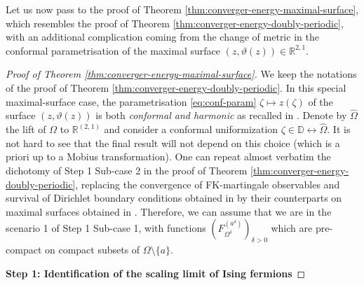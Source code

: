 \documentclass[reqno]{amsart}
\numberwithin{equation}{section}
\theoremstyle{definition}
\theoremstyle{remark}
\begin{document}
Let us now pass to the proof of Theorem \ref{thm:converger-energy-maximal-surface}, which resembles the proof of Theorem \ref{thm:converger-energy-doubly-periodic}, with an additional complication coming from the change of metric in the conformal parametrisation of the maximal surface $(z,\vartheta(z))\in \mathbb{R}^{2,1} $.
\begin{proof}[Proof of Theorem \ref{thm:converger-energy-maximal-surface}] We keep the notations of the proof of Theorem \ref{thm:converger-energy-doubly-periodic}.
In this special maximal-surface case, the parametrisation \eqref{eq:conf-param} $\zeta \mapsto z(\zeta)$ of the surface $(z, \vartheta(z))$ is both \emph{conformal and harmonic} as recalled in \cite[Section 2.5]{CLR2}. Denote by $\widehat{\Omega}$ the lift of  $\Omega$ to $\mathbb{R}^{(2,1)}$ and consider a conformal uniformization $\zeta \in \mathbb{D} \leftrightarrow  \widehat{\Omega}$. It is not hard to see that the final result will not depend on this choice (which is a priori up to a Mobius transformation). One can repeat almost verbatim the dichotomy of Step 1 Sub-case 2 in the proof of Theorem \ref{thm:converger-energy-doubly-periodic}, replacing the convergence of FK-martingale observables and survival of Dirichlet boundary conditions obtained in \cite{Che20} by their counterparts on maximal surfaces obtained in \cite{Par25}. Therefore, we can assume that we are in the scenario 1 of  Step 1 Sub-case 1, with functions $(F^{(a^\delta)}_{\Omega^\delta})_{\delta >0}$ which are pre-compact on compact subsets of $\Omega \setminus \{a\}$. 

\textbf{Step 1: Identification of the scaling limit of Ising fermions}



\end{proof}
\end{document}
